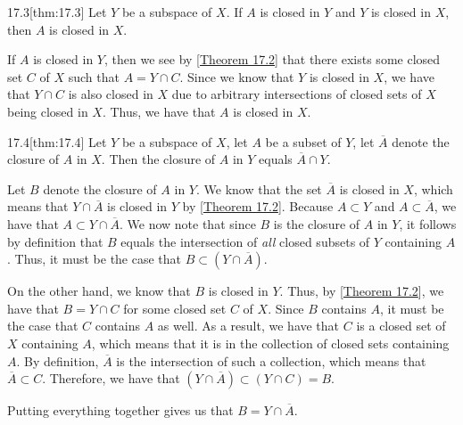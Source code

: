 \begin{thmBox}{17.3}[thm:17.3]
    Let \( Y \) be a subspace of \( X \). If \( A \) is closed in \( Y \) and 
    \( Y \) is closed in \( X \), then \( A \) is closed in \( X \).

    \baseRule

    \begin{proofBox}
        If \( A \) is closed in \( Y \), then we see by [\hyperlink{thm:17.2}
        {Theorem 17.2}] that there exists some closed set \( C \) of \( X \) 
        such that \( A = Y \cap C \).
        Since we know that \( Y \) is closed in \( X \), we have that 
        \( Y \cap C \) is also closed in \( X \) due to arbitrary intersections
        of closed sets of \( X \) being closed in \( X \).
        Thus, we have that \( A \) is closed in \( X \).
    \end{proofBox}
\end{thmBox}

\begin{thmBox}{17.4}[thm:17.4]
    Let \( Y \) be a subspace of \( X \), let \( A \) be a subset of \( Y \), 
    let \( \overline{ A } \) denote the closure of \( A \) in \( X \).
    Then the closure of \( A \) in \( Y \) equals \( \overline{ A } \cap Y \).

    \baseRule

    \begin{proofBox}
        Let \( B \) denote the closure of \( A \) in \( Y \).
        We know that the set \( \overline{ A } \) is closed in \( X \), which 
        means that \( Y \cap \overline{ A } \) is closed in \( Y \) by 
        [\hyperlink{thm:17.2}{Theorem 17.2}].
        Because \( A \subset Y \) and \( A \subset \overline{ A } \), we have 
        that \( A \subset Y \cap \overline{ A } \).
        We now note that since \( B \) is the closure of \( A \) in \( Y \),
        it follows by definition that \( B \) equals the intersection of 
        \textit{all} closed subsets of \( Y \) containing \( A \).
        Thus, it must be the case that 
        \( B \subset ( Y \cap \overline{ A } ) \).

        \baseSkip

        On the other hand, we know that \( B \) is closed in \( Y \). 
        Thus, by [\hyperlink{thm:17.2}{Theorem 17.2}], we have that
        \( B = Y \cap C \) for some closed set \( C \) of \( X \). 
        Since \( B \) contains \( A \), it must be the case that \( C \) 
        contains \( A \) as well.
        As a result, we have that \( C \) is a closed set of \( X \) 
        containing \( A \), which means that it is in the collection of closed
        sets containing \( A \).
        By definition, \( \overline{ A } \) is the intersection of such a 
        collection, which means that \( \overline{ A } \subset C \).
        Therefore, we have that \( ( Y \cap \overline{ A } ) \subset 
        ( Y \cap C ) = B \).

        \baseSkip 

        Putting everything together gives us that 
        \( B = Y \cap \overline{ A } \).
    \end{proofBox}
\end{thmBox}

